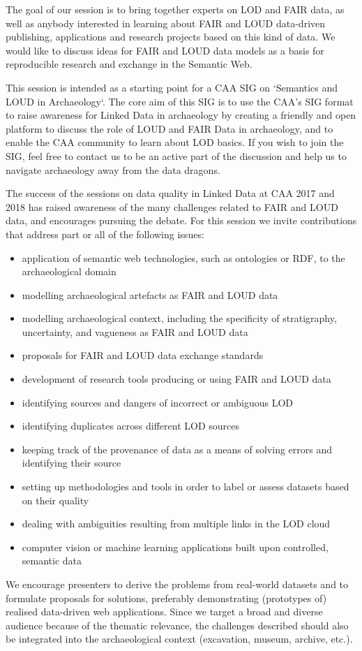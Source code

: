 \documentclass[a4paper]{article}
\begin{document}
The goal of our session is to bring together experts on LOD and FAIR data, as well as anybody interested in learning about FAIR and LOUD data-driven publishing, applications and research projects based on this kind of data. We would like to discuss ideas for FAIR and LOUD data models as a basis for reproducible research and exchange in the Semantic Web.

This session is intended as a starting point for a CAA SIG on `Semantics and LOUD in Archaeology`. The core aim of this SIG is to use the CAA’s SIG format to raise awareness for Linked Data in archaeology by creating a friendly and open platform to discuss the role of LOUD and FAIR Data in archaeology, and to enable the CAA community to learn about  LOD basics. If you wish to join the SIG, feel free to contact us to be an active part of the discussion \cite{thiery_caa_2019} and help us to navigate archaeology away from the data dragons.

The success of the sessions on data quality in Linked Data at CAA 2017 and 2018 has raised awareness of the many challenges related to FAIR and LOUD data, and encourages pursuing the debate. For this session we invite contributions that address part or all of the following issues:

\begin{itemize}
	\item application of semantic web technologies, such as ontologies or RDF, to the archaeological domain
	\item modelling archaeological artefacts as FAIR and LOUD data
	\item modelling archaeological context, including the specificity of stratigraphy, uncertainty, and vagueness as FAIR and LOUD data
	\item proposals for FAIR and LOUD data exchange standards
	\item development of research tools producing or using FAIR and LOUD data
	\item identifying sources and dangers of incorrect or ambiguous LOD
	\item identifying duplicates across different LOD sources
	\item keeping track of the provenance of data as a means of solving errors and identifying their source
	\item setting up methodologies and tools in order to label or assess datasets based on their quality
	\item dealing with ambiguities resulting from multiple links in the LOD cloud
	\item computer vision or machine learning applications built upon controlled, semantic data
\end{itemize}

We encourage presenters to derive the problems from real-world datasets and to formulate proposals for solutions, preferably demonstrating (prototypes of) realised data-driven web applications. Since we target a broad and diverse audience because of the thematic relevance, the challenges described should also be integrated into the archaeological context (excavation, museum, archive, etc.).



\end{document}
